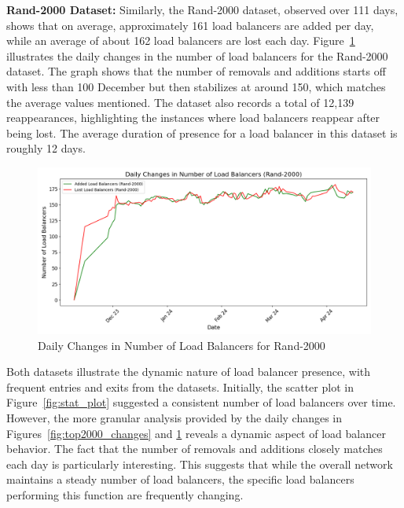 \documentclass[12pt]{cwru_thesis}
\begin{document}
\textbf{Rand-2000 Dataset:} Similarly, the Rand-2000 dataset, observed over 111 days, shows that on average, approximately 161 load balancers are added per day, while an average of about 162 load balancers are lost each day. Figure~\ref{fig:rand2000_changes} illustrates the daily changes in the number of load balancers for the Rand-2000 dataset. The graph shows that the number of removals and additions starts off with less than 100  December but then stabilizes at around 150, which matches the average values mentioned. The dataset also records a total of 12,139 reappearances, highlighting the instances where load balancers reappear after being lost. The average duration of presence for a load balancer in this dataset is roughly 12 days.

\begin{figure}[h!]
    \centering
    \includegraphics[width=\linewidth]{figures/load_balancer_changes_Rand-2000.png}
    \caption{Daily Changes in Number of Load Balancers for Rand-2000}
    \label{fig:rand2000_changes}
\end{figure}

Both datasets illustrate the dynamic nature of load balancer presence, with frequent entries and exits from the datasets. Initially, the scatter plot in Figure~\ref{fig:stat_plot} suggested a consistent number of load balancers over time. However, the more granular analysis provided by the daily changes in Figures~\ref{fig:top2000_changes} and \ref{fig:rand2000_changes} reveals a dynamic aspect of load balancer behavior. The fact that the number of removals and additions closely matches each day is particularly interesting. This suggests that while the overall network maintains a steady number of load balancers, the specific load balancers performing this function are frequently changing.\\
\end{document}
